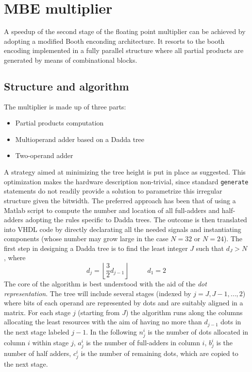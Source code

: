 \chapter{MBE multiplier}
A speedup of the second stage of the floating point multiplier can be achieved by adopting a modified Booth enconding architecture. It resorts to the booth encoding implemented in a fully parallel structure where all partial products are generated by means of combinational blocks. 
\section{Structure and algorithm}
The multiplier is made up of three parts:
\begin{itemize}
	\item Partial products computation
	\item Multioperand adder based on a Dadda tree
	\item Two-operand adder
\end{itemize}
A strategy aimed at minimizing the tree height is put in place as suggested.
This optimization makes the hardware description non-trivial, since standard \texttt{generate} statements do not readily provide a solution to parametrize this irregular structure given the bitwidth. 
The preferred approach has been that of using a Matlab script to compute the number and location of all full-adders and half-adders adopting the rules specific to Dadda trees. The outcome is then translated into VHDL code by directly declarating all the needed signals and instantiating components (whose number may grow large in the case $N=32$ or $N=24$).
The first step in designing a Dadda tree is to find the least integer $J$ such that $d_J > N$, where 
\begin{equation*}
d_j = \left \lfloor{\frac{3}{2}d_{j-1}}\right \rfloor \hspace{1cm}\,\,d_1 = 2
\end{equation*}
The core of the algorithm is best understood with the aid of the \textit{dot representation}. The tree will include several stages (indexed by $j=J, J-1, ..., 2$) where bits of each operand are represented by dots and are suitably aligned in a matrix. For each stage $j$ (starting from $J$) the algorithm runs along the columns allocating the least resources with the aim of having no more than $d_{j-1}$ dots in the next stage labeled $j-1$. In the following $n_j^i$ is the number of dots allocated in column $i$ within stage $j$, $a_j^i$ is the number of full-adders in column $i$, $b_j^i$ is the number of half adders, $c_j^i$ is the number of remaining dots, which are copied to the next stage.

